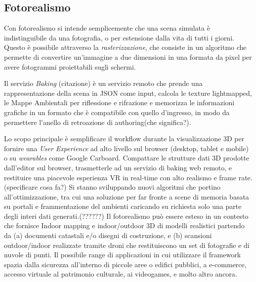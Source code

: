 
\newpage

\subsection{Fotorealismo}
\label{sec:conclusions_section_2_sub_3}
Con fotorealismo si intende semplicemente che una scena simulata \`e indistinguibile da una fotografia, o per estensione
dalla vita di tutti i giorni. Questo è possibile attraverso la \emph{rasterizzazione}, che consiste in un algoritmo che
permette di convertire un'immagine a due dimensioni in una formata da pixel per avere fotogrammi proiettabili sugli schermi.

Il servizio \emph{Baking} (citazione) \`e un servizio remoto che prende una rappresentazione della scena in JSON come input,
calcola le texture lightmapped, le Mappe Ambientali per riflessione e rifrazione e memorizza le informazioni grafiche
in un formato che \`e compatibile con quello d'ingresso, in modo da permettere l'anello di retroazione di authoring(che significa?).


Lo scopo principale \`e semplificare il workflow durante la visualizzazione 3D per fornire una \emph{User Experience}
ad alto livello sul browser (desktop, tablet e mobile) o su \emph{wearables} come Google Carboard.
Compattare le strutture dati 3D prodotte dall'editor sul browser, trasmetterle ad un servizio di baking web remoto,
e restituire una piacevole esperienza VR in real-time con alto realismo e frame rate. (specificare cosa fa?)
Si stanno sviluppando nuovi algoritmi che portino all'ottimizzazione,
tra cui una soluzione per far fronte a scene di memoria basata su portali e frammentazione del ambienti caricando
su richiesta solo una parte degli interi dati generati.(??????)
Il fotorealismo può essere esteso in un contesto che fornisce Indoor mapping e indoor/outdoor 3D di modelli realistici
partendo da (a) documenti catastali e/o disegni di costruzione, e (b) scansioni outdoor/indoor realizzate tramite droni
che restituiscono un set di fotografie e di nuvole di punti.
Il possibile range di applicazioni in cui utilizzare il framework spazia dalla sicurezza all'interno di piccole aree o edifici pubblici, a e-commerce,
accesso virtuale al patrimonio culturale, ai videogames, e molto altro ancora.

